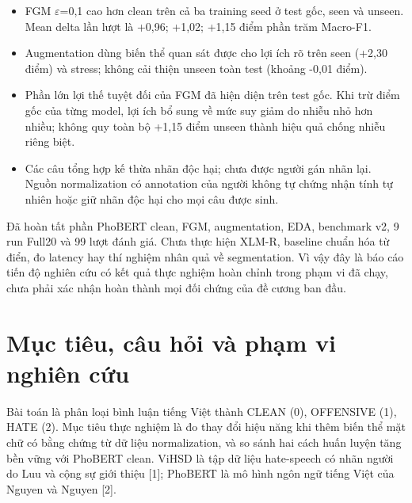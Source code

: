 \documentclass[11pt,a4paper]{article}
\begin{document}
\begin{itemize}

\item FGM \ensuremath{\varepsilon}=0,1 cao hơn clean trên cả ba training seed ở test gốc, seen và unseen. Mean delta lần lượt là +0,96; +1,02; +1,15 điểm phần trăm Macro-F1.

\item Augmentation dùng biến thể quan sát được cho lợi ích rõ trên seen (+2,30 điểm) và stress; không cải thiện unseen toàn test (khoảng -0,01 điểm).

\item Phần lớn lợi thế tuyệt đối của FGM đã hiện diện trên test gốc. Khi trừ điểm gốc của từng model, lợi ích bổ sung về mức suy giảm do nhiễu nhỏ hơn nhiều; không quy toàn bộ +1,15 điểm unseen thành hiệu quả chống nhiễu riêng biệt.

\item Các câu tổng hợp kế thừa nhãn độc hại; chưa được người gán nhãn lại. Nguồn normalization có annotation của người không tự chứng nhận tính tự nhiên hoặc giữ nhãn độc hại cho mọi câu được sinh.

\end{itemize}

Đã hoàn tất phần PhoBERT clean, FGM, augmentation, EDA, benchmark v2, 9 run Full20 và 99 lượt đánh giá. Chưa thực hiện XLM-R, baseline chuẩn hóa từ điển, đo latency hay thí nghiệm nhân quả về segmentation. Vì vậy đây là báo cáo tiến độ nghiên cứu có kết quả thực nghiệm hoàn chỉnh trong phạm vi đã chạy, chưa phải xác nhận hoàn thành mọi đối chứng của đề cương ban đầu.


\FloatBarrier\section{Mục tiêu, câu hỏi và phạm vi nghiên cứu}

Bài toán là phân loại bình luận tiếng Việt thành CLEAN (0), OFFENSIVE (1), HATE (2). Mục tiêu thực nghiệm là đo thay đổi hiệu năng khi thêm biến thể mặt chữ có bằng chứng từ dữ liệu normalization, và so sánh hai cách huấn luyện tăng bền vững với PhoBERT clean. ViHSD là tập dữ liệu hate-speech có nhãn người do Luu và cộng sự giới thiệu [1]; PhoBERT là mô hình ngôn ngữ tiếng Việt của Nguyen và Nguyen [2].
\end{document}

